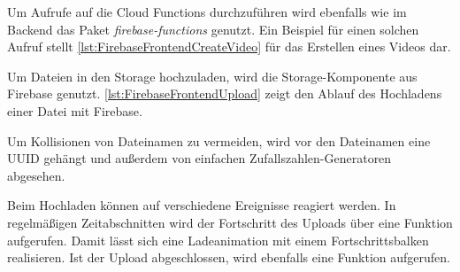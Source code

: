 Um Aufrufe auf die Cloud Functions durchzuführen wird ebenfalls wie im Backend das Paket \textit{firebase-functions} genutzt. Ein Beispiel für einen solchen Aufruf stellt \autoref{lst:FirebaseFrontendCreateVideo} für das Erstellen eines Videos dar.



Um Dateien in den Storage hochzuladen, wird die Storage-Komponente aus Firebase genutzt. \autoref{lst:FirebaseFrontendUpload} zeigt den Ablauf des Hochladens einer Datei mit Firebase.



Um Kollisionen von Dateinamen zu vermeiden, wird vor den Dateinamen eine \ac{UUID} gehängt und außerdem von einfachen Zufallszahlen-Generatoren abgesehen.

Beim Hochladen können auf verschiedene Ereignisse reagiert werden. In regelmäßigen Zeitabschnitten wird der Fortschritt des Uploads über eine Funktion aufgerufen. Damit lässt sich eine Ladeanimation mit einem Fortschrittsbalken realisieren. Ist der Upload abgeschlossen, wird ebenfalls eine Funktion aufgerufen.